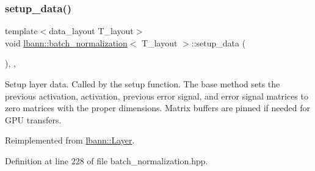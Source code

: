 \subsubsection{\texorpdfstring{setup\+\_\+data()}{setup\_data()}}
{\footnotesize\ttfamily template$<$data\+\_\+layout T\+\_\+layout$>$ \\
void \hyperlink{classlbann_1_1batch__normalization}{lbann\+::batch\+\_\+normalization}$<$ T\+\_\+layout $>$\+::setup\+\_\+data (\begin{DoxyParamCaption}{ }\end{DoxyParamCaption})\hspace{0.3cm}{\ttfamily [inline]}, {\ttfamily [override]}, {\ttfamily [virtual]}}

Setup layer data. Called by the setup function. The base method sets the previous activation, activation, previous error signal, and error signal matrices to zero matrices with the proper dimensions. Matrix buffers are pinned if needed for G\+PU transfers. 

Reimplemented from \hyperlink{classlbann_1_1Layer_a50a89f8a68762c677d48efe384676e81}{lbann\+::\+Layer}.



Definition at line 228 of file batch\+\_\+normalization.\+hpp.


